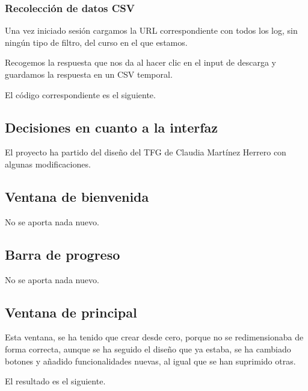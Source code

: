 
\newpage\subsubsection{Recolección de datos CSV}\label{responsive-web}

Una vez iniciado sesión cargamos la URL correspondiente con todos los log, sin ningún tipo de filtro, del curso en el que estamos.

Recogemos la respuesta que nos da al hacer clic en el input de descarga y guardamos la respuesta en un CSV temporal.

El código correspondiente es el siguiente.



\subsection{Decisiones en cuanto a la interfaz}\label{decisiones-en-cuanto-a-la-interfaz}

El proyecto ha partido del diseño del TFG de Claudia Martínez Herrero \cite{claudia} con algunas modificaciones.

\subsection{Ventana de bienvenida}\label{ventana-de-bienvenida}

No se aporta nada nuevo.

\subsection{Barra de progreso}\label{barra-de-progreso}

No se aporta nada nuevo.

\newpage\subsection{Ventana de principal}\label{ventana-de-principal}

Esta ventana, se ha tenido que crear desde cero, porque no se redimensionaba de forma correcta, aunque se ha seguido el diseño que ya estaba, se ha cambiado botones y añadido funcionalidades nuevas, al igual que se han suprimido otras. 

El resultado es el siguiente.


